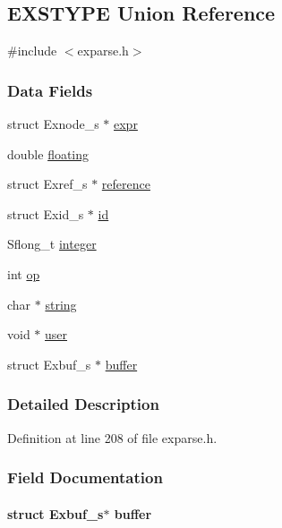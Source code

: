 \hypertarget{union_e_x_s_t_y_p_e}{\subsection{E\+X\+S\+T\+Y\+P\+E Union Reference}
\label{union_e_x_s_t_y_p_e}
}


{\ttfamily \#include $<$exparse.\+h$>$}

\subsubsection*{Data Fields}
\begin{DoxyCompactItemize}
\item 
struct Exnode\+\_\+s $\ast$ \hyperlink{union_e_x_s_t_y_p_e_a5147a7084c9f4929f621b9c1d88f37e4}{expr}
\item 
double \hyperlink{union_e_x_s_t_y_p_e_a347120387fb1d297ddcdf38a1fe7578f}{floating}
\item 
struct Exref\+\_\+s $\ast$ \hyperlink{union_e_x_s_t_y_p_e_a978c478f22a8ae8e29c509cbba1426e4}{reference}
\item 
struct Exid\+\_\+s $\ast$ \hyperlink{union_e_x_s_t_y_p_e_a8cbcc48b98839e0560a1b4ea77ad9fce}{id}
\item 
Sflong\+\_\+t \hyperlink{union_e_x_s_t_y_p_e_a18927fffeef0d58b4627da1446d7b0b8}{integer}
\item 
int \hyperlink{union_e_x_s_t_y_p_e_a8b21910e53867f3b53d61a8c46ac2a7f}{op}
\item 
char $\ast$ \hyperlink{union_e_x_s_t_y_p_e_aed1cfb225a5fb77461e7972691e68a72}{string}
\item 
void $\ast$ \hyperlink{union_e_x_s_t_y_p_e_a5ab32084b1ccaf8aaa8a0c703b8853cf}{user}
\item 
struct Exbuf\+\_\+s $\ast$ \hyperlink{union_e_x_s_t_y_p_e_acfa12300629fea2a3f9e9651b7baaa97}{buffer}
\end{DoxyCompactItemize}


\subsubsection{Detailed Description}


Definition at line 208 of file exparse.\+h.



\subsubsection{Field Documentation}
\hypertarget{union_e_x_s_t_y_p_e_acfa12300629fea2a3f9e9651b7baaa97}{
\paragraph[{buffer}]{\setlength{\rightskip}{0pt plus 5cm}struct Exbuf\+\_\+s$\ast$ buffer}}\label{union_e_x_s_t_y_p_e_acfa12300629fea2a3f9e9651b7baaa97}


